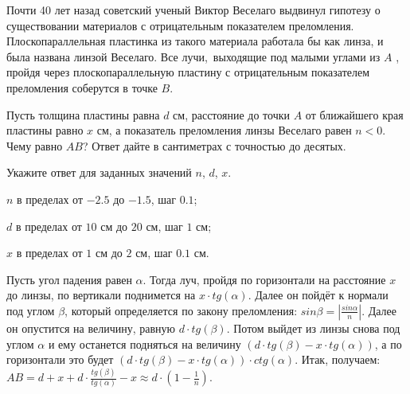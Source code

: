 
Почти 40 лет назад советский ученый
Виктор Веселаго выдвинул гипотезу о существовании материалов с отрицательным
показателем преломления. Плоскопараллельная пластинка из такого материала
работала бы как линза, и была названа линзой Веселаго. Все
лучи, выходящие под малыми углами из $A$ , пройдя через плоскопараллельную пластину с 
отрицательным показателем преломления соберутся в точке $B$.


Пусть толщина пластины равна $d$ см, расстояние до точки $A$ от ближайшего края пластины
равно $x$ см, а показатель преломления линзы Веселаго равен $n < 0$. Чему равно $AB$? Ответ
дайте в сантиметрах с точностью до десятых.

Укажите ответ для заданных значений $n$, $d$, $x$.

\paramSection

$n$ в пределах от $-2.5$ до $-1.5$, шаг $0.1$;     

$d$ в пределах от $10$ см до $20$ см, шаг $1$ см; 

$x$ в пределах от $1$ см до $2$ см, шаг $0.1$ см.

\solutionSection

Пусть угол падения равен $\alpha$. Тогда луч, пройдя по горизонтали на расстояние $x$ до линзы, по вертикали поднимется на 
$x \cdot tg(\alpha)$. Далее он пойдёт к нормали под углом $\beta$, который определяется по закону преломления: 
$sin\beta=\left|\frac{sin\alpha}{n}\right|$. Далее он опустится на величину, равную $d \cdot tg(\beta)$. 
Потом выйдет из линзы снова под углом $\alpha$ и ему останется подняться на величину $(d \cdot  tg(\beta) - x \cdot tg(\alpha) )$, 
а по горизонтали это будет $(d \cdot  tg(\beta) - x \cdot tg(\alpha )) \cdot ctg(\alpha )$. 
Итак, получаем:  $AB=d+x+d \cdot \frac{tg(\beta)}{tg(\alpha )}-x \approx d \cdot (1 - \frac{1}{n})$.


